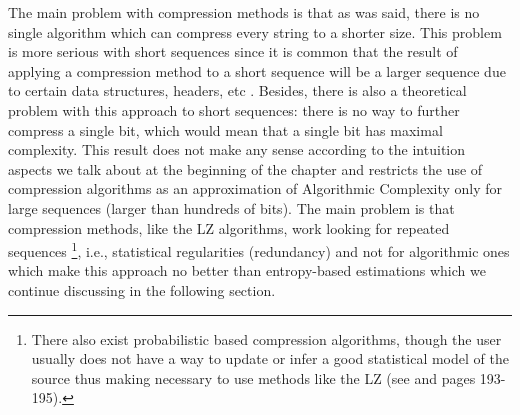 The main problem with compression methods is that as was said, there is no single algorithm which can compress every string to a shorter size. This problem is more serious with short sequences since it is common that the result of applying a compression method to a short sequence will be a larger sequence due to certain data structures, headers, etc \cite{universos}. Besides, there is also a theoretical problem with this approach to short sequences: there is no way to further compress a single bit, which would mean that a single bit has maximal complexity. This result does not make any sense according to the intuition aspects we talk about at the beginning of the chapter and restricts the use of compression algorithms as an approximation of Algorithmic Complexity only for large sequences (larger than hundreds of bits)\cite{faibles_complexites}. The main problem is that compression methods, like the LZ algorithms, work looking for repeated sequences \footnote{There also exist probabilistic based compression algorithms, though the user usually does not have a way to update or infer a good statistical model of the source thus making necessary to use methods like the LZ (see \cite{decomposition} and \cite{info_theory} pages 193-195).}, i.e., statistical regularities (redundancy) and not for algorithmic ones which make this approach no better than entropy-based estimations which we continue discussing in the following section.


